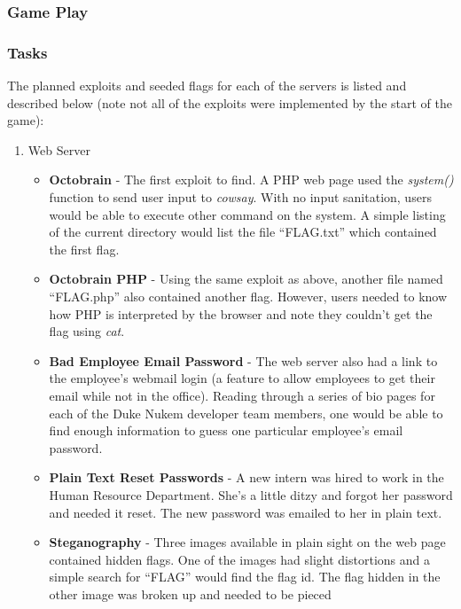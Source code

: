 \documentclass[10pt]{article}
\begin{document}
\subsubsection{Game Play}


\subsubsection{Tasks}
The planned exploits and seeded flags for each of the servers is listed and
described below (note not all of the exploits were implemented by the start of
the game):

\begin{enumerate}
  \item Web Server
      \begin{itemize}
        \item \textbf{Octobrain} - The first exploit to find. A PHP web page
        used the \textit{system()} function to send user input to
        \textit{cowsay}. With no input sanitation, users would be able to
        execute other command on the system. A simple listing of the current
        directory would list the file ``FLAG.txt'' which contained the first
        flag.
        \item \textbf{Octobrain PHP} - Using the same exploit as above, another
        file named ``FLAG.php'' also contained another flag. However, users
        needed to know how PHP is interpreted by the browser and note they
        couldn't get the flag using \textit{cat}.
        \item \textbf{Bad Employee Email Password} - The web server also had a
        link to the employee's webmail login (a feature to allow employees to
        get their email while not in the office). Reading through a series of
        bio pages for each of the Duke Nukem developer team members, one would
        be able to find enough information to guess one particular employee's
        email password.
        \item \textbf{Plain Text Reset Passwords} - A new intern was hired to
        work in the Human Resource Department. She's a little ditzy and forgot
        her password and needed it reset. The new password was emailed to her in
        plain text.
        \item \textbf{Steganography} - Three images available in plain sight on
        the web page contained hidden flags. One of the images had slight
        distortions and a simple search for ``FLAG'' would find the flag id.
        The flag hidden in the other image was broken up and needed to be pieced

\end{itemize}
\end{enumerate}
\end{document}
